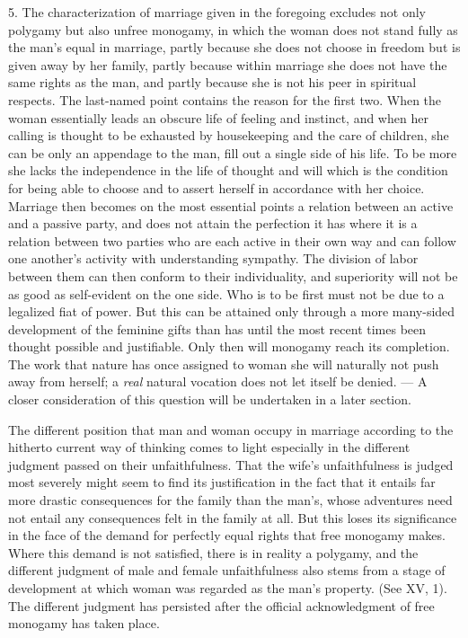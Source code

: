 \documentclass[12pt,a4paper,openany]{book}
\newcommand{\opage}[1]{\marginnote{\footnotesize\textit{[#1]}}}
\begin{document}
5. The characterization of marriage given in the foregoing excludes not only polygamy but also unfree monogamy, in which
the woman does not stand fully as the man's equal in marriage, partly because she does not choose in freedom but is
given away by her family, partly because within marriage she does not have the same rights as the man, and partly
because she is not his peer in spiritual respects. The last-named point contains the reason for the first two. When the
woman essentially leads an obscure life of feeling and instinct, and when her calling is thought to be exhausted by
housekeeping and the care of children, she can be only an appendage to the man, fill out a single side of his life. To
be more she lacks the independence in the life of thought and will which is the condition for being able to choose and
to assert herself in accordance with her choice. Marriage then becomes on the most essential points a relation between
an active and a passive party, and does not attain the perfection it has where it is a relation between two parties
who are each active in their own way and can follow one another's activity with understanding sympathy. The division of
labor between them can then conform to their individuality, and superiority will not be as good as
\opage{295}self-evident on the one side. Who is to be first must not be due to a legalized fiat of power. But this can
be attained only through a more many-sided development of the feminine gifts than has until the most recent times been
thought possible and justifiable. Only then will monogamy reach its completion. The work that nature has once assigned
to woman she will naturally not push away from herself; a \textit{real} natural vocation does not let itself be denied.
--- A closer consideration of this question will be undertaken in a later section.

The different position that man and woman occupy in marriage according to the hitherto current way of thinking comes to
light especially in the different judgment passed on their unfaithfulness. That the wife's unfaithfulness is judged
most severely might seem to find its justification in the fact that it entails far more drastic consequences for the
family than the man's, whose adventures need not entail any consequences felt in the family at all. But this loses its
significance in the face of the demand for perfectly equal rights that free monogamy makes. Where this demand is not
satisfied, there is in reality a polygamy, and the different judgment of male and female unfaithfulness also stems from
a stage of development at which woman was regarded as the man's property. (See XV, 1). The different judgment has
persisted after the official acknowledgment of free monogamy has taken place.
\end{document}
